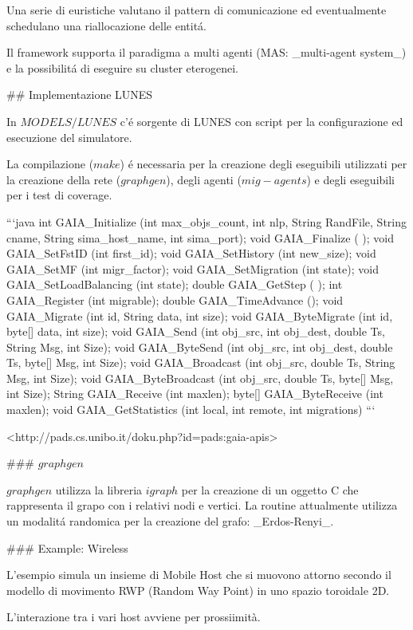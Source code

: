 Una serie di euristiche valutano il pattern di comunicazione ed eventualmente schedulano una riallocazione delle entitá.

Il framework supporta il paradigma a multi agenti (MAS: \_multi-agent system\_) e la possibilitá di eseguire su cluster eterogenei.

## Implementazione LUNES

In $MODELS/LUNES$ c'é sorgente di LUNES con script per la configurazione ed esecuzione del simulatore.

La compilazione ($make$) é necessaria per la creazione degli eseguibili utilizzati per la creazione della rete ($graphgen$), degli agenti ($mig-agents$) e degli eseguibili per i test di coverage.

```java
int     GAIA\_Initialize (int max\_objs\_count, int nlp, String RandFile, String cname, String sima\_host\_name, int sima\_port);
void    GAIA\_Finalize ( );
void    GAIA\_SetFstID (int first\_id);
void    GAIA\_SetHistory (int new\_size);
void    GAIA\_SetMF (int migr\_factor);
void    GAIA\_SetMigration (int state);
void    GAIA\_SetLoadBalancing (int state);
double  GAIA\_GetStep ( );
int     GAIA\_Register (int migrable);
double  GAIA\_TimeAdvance ();
void    GAIA\_Migrate (int id, String data, int size);
void    GAIA\_ByteMigrate (int id, byte[] data, int size);
void    GAIA\_Send (int obj\_src, int obj\_dest, double Ts, String Msg, int Size);
void    GAIA\_ByteSend (int obj\_src, int obj\_dest, double Ts, byte[] Msg, int Size);
void    GAIA\_Broadcast (int obj\_src, double Ts, String Msg, int Size);
void    GAIA\_ByteBroadcast (int obj\_src, double Ts, byte[] Msg, int Size);
String  GAIA\_Receive (int maxlen);
byte[]  GAIA\_ByteReceive (int maxlen);
void    GAIA\_GetStatistics (int local, int remote, int migrations)
```

<http://pads.cs.unibo.it/doku.php?id=pads:gaia-apis>

### $graphgen$

$graphgen$ utilizza la libreria $igraph$ per la creazione di un oggetto C che rappresenta il grapo con i relativi nodi e vertici. La routine attualmente utilizza un modalitá randomica per la creazione del grafo: \_Erdos-Renyi\_.

### Example: Wireless

L'esempio simula un insieme di Mobile Host che si muovono attorno secondo il modello di movimento RWP (Random Way Point) in uno spazio toroidale 2D.

L'interazione tra i vari host avviene per prossiimità.

